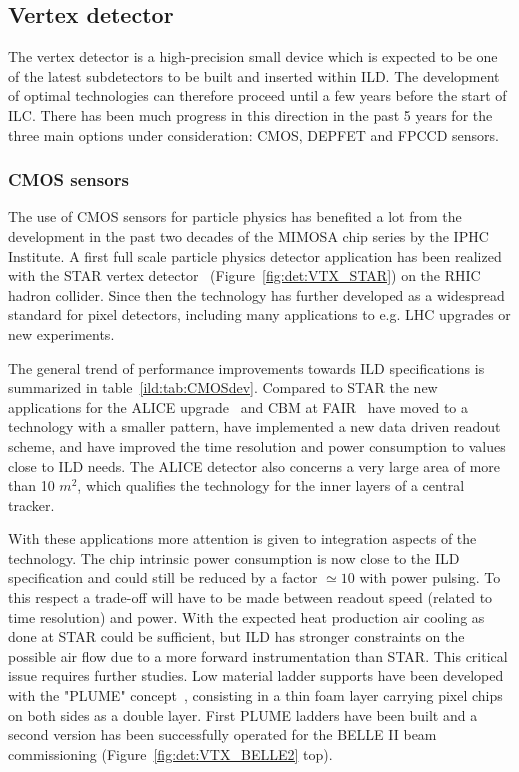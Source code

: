 
\vspace{1.0cm}

\subsection{Vertex detector}

The vertex detector is a high-precision small device which is expected to be one of the latest subdetectors to be built and inserted within ILD. The development of optimal technologies can therefore proceed until a few years before the start of ILC. There has been much progress in this direction in the past 5 years for the three main options under consideration: CMOS, DEPFET and FPCCD sensors.

\subsubsection{CMOS sensors}

The use of CMOS sensors for particle physics has benefited a lot from the development in the past two decades of the MIMOSA chip series by the IPHC Institute. A first full scale particle physics detector application has been realized with the STAR vertex detector~\cite{Contin:2017mck} (Figure~\ref{fig:det:VTX_STAR}) on the RHIC hadron collider. Since then the technology has further developed as a widespread standard for pixel detectors, including many applications to e.g. LHC upgrades or new experiments. 

The general trend of performance improvements towards ILD specifications is summarized in table~\ref{ild:tab:CMOSdev}. Compared to STAR the new applications for the ALICE upgrade~\cite{AglieriRinella:2017lym} and CBM at FAIR~\cite{Koziel:2017loo} have moved to a technology with a smaller pattern, have implemented a new data driven readout scheme, and have improved the time resolution and power consumption to values close to ILD needs. The ALICE detector also concerns a very large area of more than 10 $m^2$, which qualifies the technology for the inner layers of a central tracker.

With these applications more attention is given to integration aspects of the technology. The chip intrinsic power consumption is now close to the ILD specification and could still be reduced by a factor $\simeq 10$ with power pulsing. To this respect a trade-off will have to be made between readout speed (related to time resolution) and power. With the expected heat production air cooling as done at STAR could be sufficient, but ILD has stronger constraints on the possible air flow due to a more forward instrumentation than STAR. This critical issue requires further studies. Low material ladder supports have been developed with the "PLUME" concept~\cite{Nomerotski:2011zz}, consisting in a thin foam layer carrying pixel chips on both sides as a double layer. First PLUME ladders have been built and a second version has been successfully operated for the BELLE II beam commissioning (Figure~\ref{fig:det:VTX_BELLE2} top).

